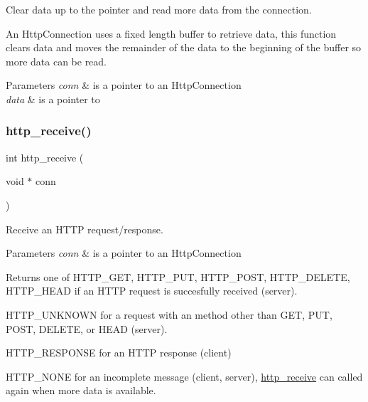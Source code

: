 Clear data up to the pointer and read more data from the connection. 

An Http\+Connection uses a fixed length buffer to retrieve data, this function clears data and moves the remainder of the data to the beginning of the buffer so more data can be read. 
\begin{DoxyParams}{Parameters}
{\em conn} & is a pointer to an Http\+Connection \\
\hline
{\em data} & is a pointer to \\
\hline
\end{DoxyParams}
\mbox{\label{group__http__connection_ga8573192ee45dd0e3a5111bab62e03e44}} 
\subsubsection{\texorpdfstring{http\+\_\+receive()}{http\_receive()}}
{\footnotesize\ttfamily int http\+\_\+receive (\begin{DoxyParamCaption}\item[{void $\ast$}]{conn }\end{DoxyParamCaption})}



Receive an H\+T\+TP request/response. 


\begin{DoxyParams}{Parameters}
{\em conn} & is a pointer to an Http\+Connection \\
\hline
\end{DoxyParams}
\begin{DoxyReturn}{Returns}
one of H\+T\+T\+P\+\_\+\+G\+ET, H\+T\+T\+P\+\_\+\+P\+UT, H\+T\+T\+P\+\_\+\+P\+O\+ST, H\+T\+T\+P\+\_\+\+D\+E\+L\+E\+TE, H\+T\+T\+P\+\_\+\+H\+E\+AD if an H\+T\+TP request is succesfully received (server).
\end{DoxyReturn}
H\+T\+T\+P\+\_\+\+U\+N\+K\+N\+O\+WN for a request with an method other than G\+ET, P\+UT, P\+O\+ST, D\+E\+L\+E\+TE, or H\+E\+AD (server).

H\+T\+T\+P\+\_\+\+R\+E\+S\+P\+O\+N\+SE for an H\+T\+TP response (client)

H\+T\+T\+P\+\_\+\+N\+O\+NE for an incomplete message (client, server), \hyperlink{group__http__connection_ga8573192ee45dd0e3a5111bab62e03e44}{http\+\_\+receive} can called again when more data is available.

